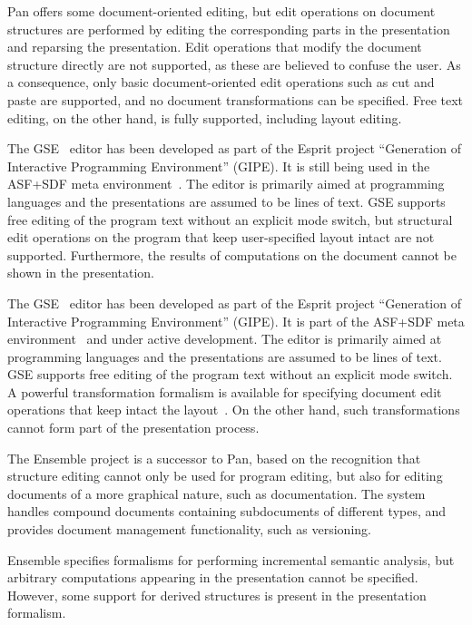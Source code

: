 \documentclass{speauth}
\begin{document}
Pan offers some document-oriented editing, but edit operations on document structures are performed by editing the corresponding parts in the presentation and reparsing the presentation. Edit operations that modify the document structure directly are not supported, as these are believed to confuse the user. As a consequence, only basic document-oriented edit operations such as cut and paste are supported, and no document transformations can be specified. Free text editing, on the other hand, is fully supported, including layout editing. 


\bc
The GSE~\cite{koorn92gse} editor has been developed as part of the Esprit project ``Generation of Interactive Programming Environment'' (GIPE). It is still being used in the ASF+SDF meta environment~\cite{klint93asfsdf}. The editor is primarily aimed at programming languages and the presentations are assumed to be lines of text. GSE supports free editing of the program text without an explicit mode switch, but structural edit operations on the program that keep user-specified layout intact are not supported. Furthermore, the results of computations on the document cannot be shown in the presentation. \ec

The GSE~\cite{koorn92gse} editor has been developed as part of the Esprit project ``Generation of Interactive Programming Environment'' (GIPE). It is part of the ASF+SDF meta environment~\cite{klint93asfsdf} and under active development. The editor is primarily aimed at programming languages and the presentations are assumed to be lines of text. GSE supports free editing of the program text without an explicit mode switch. A powerful transformation formalism is available for specifying document edit operations that keep intact the layout~\cite{brand00rewriteLayout}. On the other hand, such transformations cannot form part of the presentation process.



The Ensemble project is a successor to Pan, based on the recognition that structure editing cannot only be used for program editing, but also for editing documents of a more graphical nature, such as documentation. The system handles compound documents containing subdocuments of different types, and provides document management functionality, such as versioning.

Ensemble specifies formalisms for performing incremental semantic analysis, but arbitrary computations appearing in the presentation cannot be specified. However, some support for derived structures is present in the presentation formalism.
\end{document}
